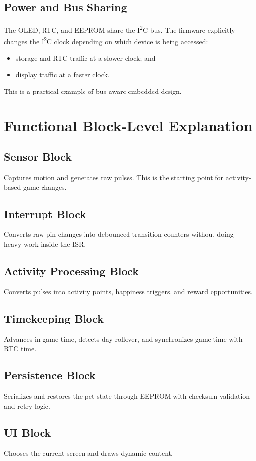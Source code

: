 \documentclass[conference]{IEEEtran}
\begin{document}
\subsection{Power and Bus Sharing}
The OLED, RTC, and EEPROM share the I\textsuperscript{2}C bus. The firmware explicitly changes the I\textsuperscript{2}C clock depending on which device is being accessed:
\begin{itemize}
\item storage and RTC traffic at a slower clock; and
\item display traffic at a faster clock.
\end{itemize}
This is a practical example of bus-aware embedded design.

\section{Functional Block-Level Explanation}
\subsection{Sensor Block}
Captures motion and generates raw pulses. This is the starting point for activity-based game changes.

\subsection{Interrupt Block}
Converts raw pin changes into debounced transition counters without doing heavy work inside the ISR.

\subsection{Activity Processing Block}
Converts pulses into activity points, happiness triggers, and reward opportunities.

\subsection{Timekeeping Block}
Advances in-game time, detects day rollover, and synchronizes game time with RTC time.

\subsection{Persistence Block}
Serializes and restores the pet state through EEPROM with checksum validation and retry logic.

\subsection{UI Block}
Chooses the current screen and draws dynamic content.
\end{document}
